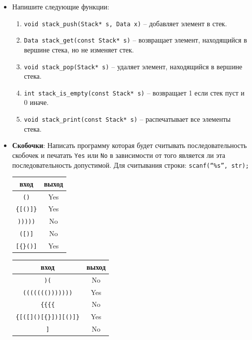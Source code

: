 \documentclass[10pt]{article}
\begin{document}
\begin{itemize}
\item Напишите следующие функции:
\begin{enumerate}
\item \texttt{void stack\_push(Stack* s, Data x)} -- добавляет элемент в стек.
\item \texttt{Data stack\_get(const Stack* s)} -- возвращает элемент, находящийся в вершине стека, но не изменяет стек.
\item \texttt{void stack\_pop(Stack* s)} -- удаляет элемент, находящийся в вершине стека. 
\item \texttt{int stack\_is\_empty(const Stack* s)} -- возвращает 1 если стек пуст и 0 иначе.
\item \texttt{void stack\_print(const Stack* s)} -- распечатывает все элементы стека.
\end{enumerate}



\item \textbf{Скобочки}: Написать программу которая будет считывать последовательность скобочек и
печатать \texttt{Yes} или \texttt{No} в зависимости от того является ли эта последовательность допустимой. Для считывания строки: \texttt{scanf(``\%s'', str);}
\begin{multicols}{2}
\begin{center}
\begin{tabular}{ c | c }
 вход & выход \\ \hline
 \texttt{()} & Yes \\
 \texttt{\{[()]\}} & Yes  \\ 
 \texttt{)))))}  &  No \\ 
 \texttt{([)]}  &  No \\ 
 \texttt{[\{\}()]}  &  Yes \\ 
\end{tabular}
\end{center}

\begin{center}
\begin{tabular}{ c | c }
 вход & выход \\ \hline
 \texttt{)(}  &  No \\
 \texttt{((((((()))))))} & Yes \\
 \texttt{\{\{\{\{} & No  \\ 
 \texttt{\{[([]()[\{\}])][()]\}}  &  Yes \\ 
 \texttt{]}  &  No \\ 
\end{tabular}
\end{center}
\end{multicols}



\end{itemize}
\end{document}
